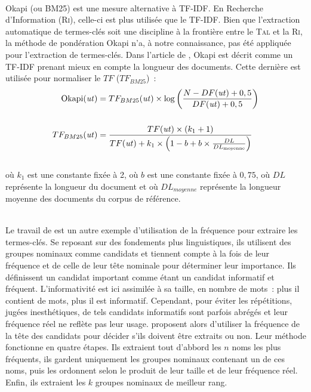         ~\\Okapi (ou BM25) \cite{robertson1999okapi} est une mesure alternative
        à TF-IDF. En Recherche d'Information (\textsc{Ri}), celle-ci est plus
        utilisée que le TF-IDF. Bien que l'extraction automatique de termes-clés
        soit une discipline à la frontière entre le \textsc{Tal} et la
        \textsc{Ri}, la méthode de pondération Okapi n'a, à notre connaissance,
        pas été appliquée pour l'extraction de termes-clés. Dans l'article de
        , Okapi est décrit comme un TF-IDF
        prenant mieux en compte la longueur des documents. Cette dernière est
        utilisée pour normaliser le $TF$ ($TF_{BM25}$)~:
        \begin{align}
          \text{Okapi}(\text{\textit{ut}}) &= TF_{BM25}(\text{\textit{ut}}) \times \log\left(\frac{N - DF(\text{\textit{ut}}) + 0,5}{DF(\text{\textit{ut}}) + 0,5}\right) \label{math:okapi}\\
          \notag\\
          TF_{BM25}(\text{\textit{ut}}) &= \frac{TF(\text{\textit{ut}}) \times (k_1 + 1)}{TF(\text{\textit{ut}}) + k_1 \times \left(1 - b + b \times \frac{DL}{DL_{\text{moyenne}}}\right)} \label{math:tf_bm25}
        \end{align}\\
        où $k_1$ est une constante fixée à 2, où $b$ est une constante fixée à
        $0,75$, où $DL$ représente la longueur du document et où $DL_{moyenne}$
        représente la longueur moyenne des documents du corpus de référence.

        ~\\Le travail de  est un autre exemple
        d'utilisation de la fréquence pour extraire les termes-clés. Se reposant
        sur des fondements plus linguistiques, ils utilisent des groupes
        nominaux comme candidats et tiennent compte à la fois de leur fréquence
        et de celle de leur tête nominale pour déterminer leur importance. Ils
        définissent un candidat important comme étant un candidat informatif et
        fréquent. L'informativité est ici assimilée à sa taille, en nombre de
        mots~: plus il contient de mots, plus il est informatif. Cependant, pour
        éviter les répétitions, jugées inesthétiques, de tels candidats
        informatifs sont parfois abrégés et leur fréquence réel ne reflète pas
        leur usage.  proposent alors
        d'utiliser la fréquence de la tête des candidats pour décider s'ils
        doivent être extraits ou non. Leur méthode fonctionne en quatre étapes.
        Ils extraient tout d'abbord les $n$ noms les plus fréquents, ils gardent
        uniquement les groupes nominaux contenant un de ces noms, puis les
        ordonnent selon le produit de leur taille et de leur fréquence réel.
        Enfin, ils extraient les $k$ groupes nominaux de meilleur rang.

